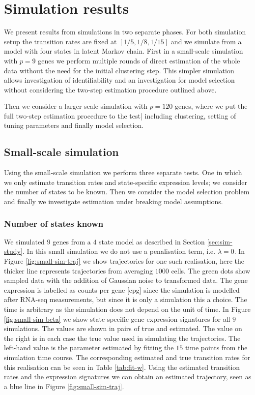 \section{Simulation results}
\label{sec:results}

We present results from simulations in two separate phases. For both simulation setup the transition rates are fixed at $[1/5, 1/8, 1/15]$ and we simulate from a model with four states in latent Markov chain. First in a small-scale simulation with $p=9$ genes we perform multiple rounds of direct estimation of the whole data without the need for the initial clustering step. This simpler simulation allows investigation of identifiability and an investigation for model selection without considering the two-step estimation procedure outlined above.

Then we consider a larger scale simulation with $p=120$ genes, where we put the full two-step estimation procedure to the test| including clustering, setting of tuning parameters and finally model selection.



\subsection{Small-scale simulation}
\label{sec:small-scale-model}

Using the small-scale simulation we perform three separate  tests. One in which we only estimate transition rates and state-specific expression levels; we consider the number of states to be known. Then we consider the model selection problem and finally we investigate estimation under breaking model assumptions.

\subsubsection{Number of states known}
\label{sec:number-states-known}

We simulated $9$ genes from a $4$ state model as described in Section \ref{sec:sim-study}. In this small simulation we do not use a penalisation term, i.e. $\lambda=0$. In Figure \ref{fig:small-sim-traj} we show trajectories for one such realisation, here the thicker line represents trajectories from averaging $1000$ cells. The green dots show sampled data with the addition of Gaussian noise to transformed data. The gene expression is labelled as counts per gene [cpg] since the simulation is modelled after RNA-seq measurements, but since it is only a simulation this a choice. The time is arbitrary as the simulation does not depend on the unit of time. In Figure \ref{fig:small-sim-beta} we show state-specific gene expression signatures for all $9$ simulations. The values are shown in pairs of true and estimated. The value on the right is in each case the true value used in simulating the trajectories. The left-hand value is the parameter estimated by fitting the $15$ time points from the simulation time course. The corresponding estimated and true transition rates for this realisation can be seen in Table \ref{tab:fit-w}. Using the estimated transition rates and the expression signatures we can obtain an estimated trajectory, seen as a blue line in Figure \ref{fig:small-sim-traj}.


